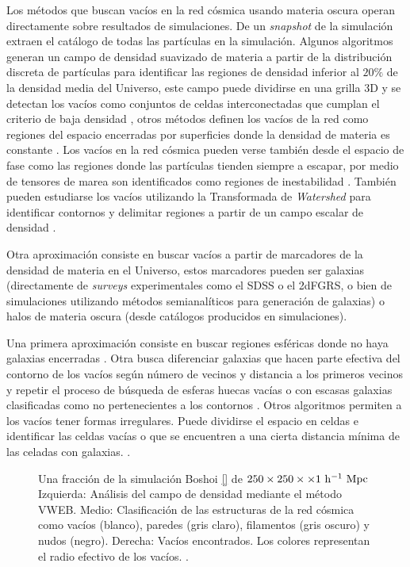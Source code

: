 \documentclass[preprint]{aastex62}
\begin{document}
  Los métodos que buscan vacíos en la red cósmica usando materia oscura operan directamente sobre
  resultados de simulaciones. De un \textit{snapshot} de la simulación extraen el catálogo de todas
  las partículas en la simulación. Algunos algoritmos generan un campo de densidad suavizado de
  materia a partir de la distribución discreta de partículas para identificar las regiones de
  densidad inferior al $20\%$ de la densidad media del Universo\citep{Ref_Aspen-Amsterdam2008},
  este campo puede dividirse en una grilla 3D y se detectan los vacíos como conjuntos de celdas
  interconectadas que cumplan el criterio de baja densidad \citep{Ref_Aspen-Amsterdam2008},
  otros métodos definen los vacíos de la red como regiones del espacio encerradas por superficies
  donde la densidad de materia es constante \citep{Ref_Aspen-Amsterdam2008}.
  Los vacíos en la red cósmica pueden verse también desde el espacio de fase como las regiones
  donde las partículas tienden siempre a escapar, por medio de tensores de marea son identificados
  como regiones de inestabilidad \citep{Ref_Aspen-Amsterdam2008}.
  También pueden estudiarse los vacíos utilizando la Transformada de \textit{Watershed} para
  identificar contornos y delimitar regiones a partir de un campo escalar de densidad
  \citep{Ref_Aspen-Amsterdam2008}.

  Otra aproximación consiste en buscar vacíos a partir de marcadores de la densidad de materia
  en el Universo, estos marcadores pueden ser galaxias (directamente de \textit{surveys} experimentales como el
  SDSS o el 2dFGRS, o bien de simulaciones utilizando métodos semianalíticos para generación de
  galaxias) o halos de materia oscura (desde catálogos producidos en simulaciones).

  Una primera aproximación consiste en buscar regiones esféricas donde no haya galaxias encerradas
  \citep{Ref_Aspen-Amsterdam2008}. Otra busca diferenciar galaxias que hacen parte efectiva del contorno
  de los vacíos según número de vecinos y distancia a los primeros vecinos y repetir el proceso de
  búsqueda de esferas huecas vacías o con escasas galaxias clasificadas como no pertenecientes a
  los contornos \citep{Ref_Aspen-Amsterdam2008}. Otros algoritmos permiten a los vacíos tener
  formas irregulares. Puede dividirse el espacio en celdas e identificar las celdas vacías o que
  se encuentren a una cierta distancia mínima de las celadas con galaxias. \citep{Ref_Aspen-Amsterdam2008}.


  \begin{figure}
    \caption{Una fracción de la simulación Boshoi \ref{} de $250 \times 250 \times \times 1 \rm ~h^{-1}~Mpc$
      Izquierda: Análisis del campo de densidad mediante el método VWEB.
      Medio: Clasificación de las estructuras de la red cósmica como vacíos (blanco),
      paredes (gris claro), filamentos (gris oscuro) y nudos (negro).
      Derecha: Vacíos encontrados. Los colores representan el radio efectivo de los vacíos.
      \citet{https://arxiv.org/pdf/1009.}. \label{fig:voids_in_simulations}}
  \end{figure}
  
\end{document}
